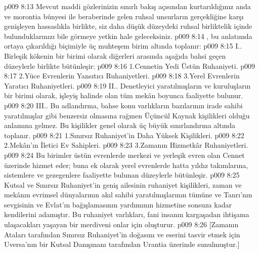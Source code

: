 \vs p009 8:13 Mevcut maddi gözlerinizin sınırlı bakış açısından kurtarıldığınız anda ve morontia bünyesi ile beraberinde gelen ruhsal unsurların gerçekliğine karşı genişleyen hassaslıkla birlikte, siz daha düşük düzeydeki ruhsal birliktelik içinde bulunduklarınızı bile görmeye yetkin hale geleceksiniz.
\vs p009 8:14 , bu anlatımda ortaya çıkarıldığı biçimiyle üç muhteşem birim altında toplanır:
\vs p009 8:15 I.\bibnobreakspace {}. Birleşik kökenin bir birimi olarak diğerleri arasında aşağıda bahsi geçen düzeylerle birlikte bütünleşir:
\vs p009 8:16 1.\bibnobreakspace Cennetin Yedi Üstün Ruhaniyeti.
\vs p009 8:17 2.\bibnobreakspace Yüce Evrenlerin Yansıtıcı Ruhaniyetleri.
\vs p009 8:18 3.\bibnobreakspace Yerel Evrenlerin Yaratıcı Ruhaniyetleri.
\vs p009 8:19 II.\bibnobreakspace {}. Denetleyici yaratılmışların ve kuruluşların bir birimi olarak, işleyiş halinde olan tüm mekân boyunca faaliyette bulunur.
\vs p009 8:20 III.\bibnobreakspace {}. Bu adlandırma, bahse konu varlıkların bazılarının irade sahibi yaratılmışlar gibi benzersiz olmasına rağmen Üçüncül Kaynak kişilikleri olduğu anlamına gelmez. Bu kişilikler genel olarak üç büyük sınırlandırma altında toplanır.
\vs p009 8:21 1.\bibnobreakspace Sınırsız Ruhaniyet’in Daha Yüksek Kişilikleri.
\vs p009 8:22 2.\bibnobreakspace Mekân’ın İletici Ev Sahipleri.
\vs p009 8:23 3.\bibnobreakspace Zamanın Hizmetkâr Ruhaniyetleri.
\vs p009 8:24 Bu birimler üstün evrenlerde merkezi ve yerleşik evren olan Cennet üzerinde hizmet eder; buna ek olarak yerel evrenlerde hatta yıldız takımlarına, sistemlere ve gezegenlere faaliyette bulunan düzeylerle bütünleşir.
\vs p009 8:25 Kutsal ve Sınırsız Ruhaniyet’in geniş ailesinin ruhaniyet kişilikleri, zaman ve mekânın evrimsel dünyalarının akıl sahibi yaratılmışlarının tümüne ve Tanrı’nın sevgisinin ve Evlat’ın bağışlamasının yardımının hizmetine sonsuza kadar kendilerini adamıştır. Bu ruhaniyet varlıkları, fani insanın kargaşadan ihtişama ulaşacakları yaşayan bir merdiveni onlar için oluşturur.
\vs p009 8:26 [Zamanın Ataları tarafından Sınırsız Ruhaniyet’in doğasını ve eserini tasvir etmek için Uversa’nın bir Kutsal Danışmanı tarafından Urantia üzerinde sunulmuştur.]
